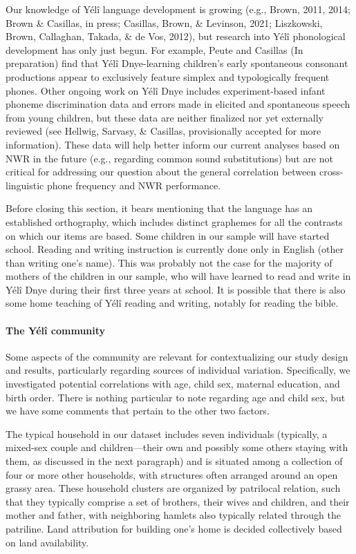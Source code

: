 \documentclass[
  american,
  ,man,floatsintext]{apa6}
\let\oldparagraph\paragraph
\renewcommand{\paragraph}[1]{\oldparagraph{#1}\mbox{}}
\begin{document}
Our knowledge of Yélî language development is growing (e.g., Brown, 2011, 2014; Brown \& Casillas, in press; Casillas, Brown, \& Levinson, 2021; Liszkowski, Brown, Callaghan, Takada, \& de Vos, 2012), but research into Yélî phonological development has only just begun. For example, Peute and Casillas (In preparation) find that Yélî Dnye-learning children's early spontaneous consonant productions appear to exclusively feature simplex and typologically frequent phones. Other ongoing work on Yélî Dnye includes experiment-based infant phoneme discrimination data and errors made in elicited and spontaneous speech from young children, but these data are neither finalized nor yet externally reviewed (see Hellwig, Sarvasy, \& Casillas, provisionally accepted for more information). These data will help better inform our current analyses based on NWR in the future (e.g., regarding common sound substitutions) but are not critical for addressing our question about the general correlation between cross-linguistic phone frequency and NWR performance.

Before closing this section, it bears mentioning that the language has an established orthography, which includes distinct graphemes for all the contrasts on which our items are based. Some children in our sample will have started school. Reading and writing instruction is currently done only in English (other than writing one's name). This was probably not the case for the majority of mothers of the children in our sample, who will have learned to read and write in Yélî Dnye during their first three years at school. It is possible that there is also some home teaching of Yélî reading and writing, notably for reading the bible.

\hypertarget{the-yuxe9luxee-community}{%
\paragraph{The Yélî community}\label{the-yuxe9luxee-community}}

Some aspects of the community are relevant for contextualizing our study design and results, particularly regarding sources of individual variation. Specifically, we investigated potential correlations with age, child sex, maternal education, and birth order. There is nothing particular to note regarding age and child sex, but we have some comments that pertain to the other two factors.

The typical household in our dataset includes seven individuals (typically, a mixed-sex couple and children---their own and possibly some others staying with them, as discussed in the next paragraph) and is situated among a collection of four or more other households, with structures often arranged around an open grassy area. These household clusters are organized by patrilocal relation, such that they typically comprise a set of brothers, their wives and children, and their mother and father, with neighboring hamlets also typically related through the patriline. Land attribution for building one's home is decided collectively based on land availability.
\end{document}
